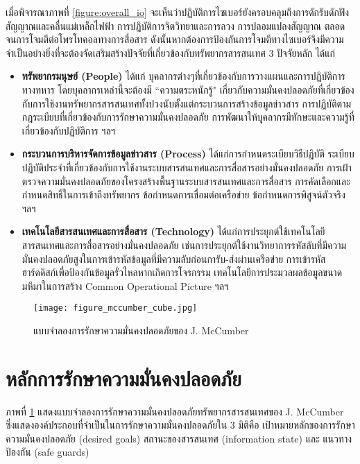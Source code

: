 \documentclass[../th_cyber_warfare_distilled.tex]{subfiles}
\begin{document}
เมื่อพิจารณาภาพที่ \ref{figure:overall_io} จะเห็นว่าปฏิบัติการไซเบอร์ยังครอบคลุมถึงการดักรับดักฟังสัญญาณและคลื่นแม่เหล็กไฟฟ้า การปฏิบัติการจิตวิทยาและการลวง การปลอมแปลงสัญญาณ ตลอดจนการโจมตีต่อโพรโทคอลทางการสื่อสาร ดังนั้นหากต้องการป้องกันการโจมตีทางไซเบอร์จึงมีความจำเป็นอย่างยิ่งที่จะต้องจัดเสริมสร้างปัจจัยที่เกี่ยวข้องกับทรัพยากรสารสนเทศ 3 ปัจจัยหลัก ได้แก่
\begin{itemize}
	\item \textbf{ทรัพยากรมนุษย์ (People)} ได้แก่ บุคลากรต่างๆที่เกี่ยวข้องกับการวางแผนและการปฏิบัติการทางทหาร โดยบุคลากรเหล่านี้จะต้องมี ``ความตระหนักรู้" เกี่ยวกับความมั่นคงปลอดภัยที่เกี่ยวข้องกับการใช้งานทรัพยากรสารสนเทศทั้งปวงนับตั้งแต่กระบวนการสร้างข้อมูลข่าวสาร การปฏิบัติตามกฎระเบียบที่เกี่ยวข้องกับการรักษาความมั่นคงปลอดภัย การพัฒนาให้บุุคลากรมีทักษะและความรู้ที่เกี่ยวข้องกับปฏิบัติการ ฯลฯ
	\item \textbf{กระบวนการบริหารจัดการข้อมูลข่าวสาร (Process)} ได้แก่การกำหนดระเบียบวิธีปฏิบัติ ระเบียบปฏิบัติประจำที่เกี่ยวข้องกับการใช้งานระบบสารสนเทศและการสื่อสารอย่างมั่นคงปลอดภัย การเฝ้าตรวจความมั่นคงปลอดภัยของโครงสร้างพื้นฐานระบบสารสนเทศและการสื่อสาร การคัดเลือกและกำหนดสิทธิ์ในการเข้าถึงทรัพยากร ข้อกำหนดการเชื่อมต่อเครือข่าย ข้อกำหนดการพิสูจน์ตัวจริง ฯลฯ 
	\item \textbf{เทคโนโลยีสารสนเทศและการสื่อสาร (Technology)} ได้แก่การประยุกต์ใช้เทคโนโลยีสารสนเทศและการสื่อสารอย่างมั่นคงปลอดภัย เช่นการประยุกต์ใช้งานวิทยาการรหัสลับที่มีความมั่นคงปลอดภัยสูงในการเข้ารหัสข้อมูลที่มีความลับก่อนการับ-ส่งผ่านเครือข่าย การเข้ารหัสฮาร์ดดิสก์เพื่อป้องกันข้อมูลรั่วไหลหากเกิดการโจรกรรม เทคโนโลยีการประมวลผลข้อมูลขนาดมหึมาในการสร้าง Common Operational Picture ฯลฯ
\end{itemize} 

\begin{figure}
	\texttt{[image: figure\_mccumber\_cube.jpg]}
	\centering
	\caption{แบบจำลองการรักษาความมั่นคงปลอดภัยของ J. McCumber}
	\label{figure:mcumber_cube}
\end{figure}

\section{หลักการรักษาความมั่นคงปลอดภัย}

ภาพที่ \ref{figure:mcumber_cube} แสดงแบบจำลองการรักษาความมั่นคงปลอดภัยทรัพยากรสารสนเทศของ J. McCumber ซึ่งแสดงองค์ประกอบที่จำเป็นในการรักษาความมั่นคงปลอดภัยใน 3 มิติคือ เป้าหมายหลักของการรักษาความมั่นคงปลอดภัย (desired goals) สถานะของสารสนเทศ (information state) และ แนวทางป้องกัน (safe guards)
\end{document}
